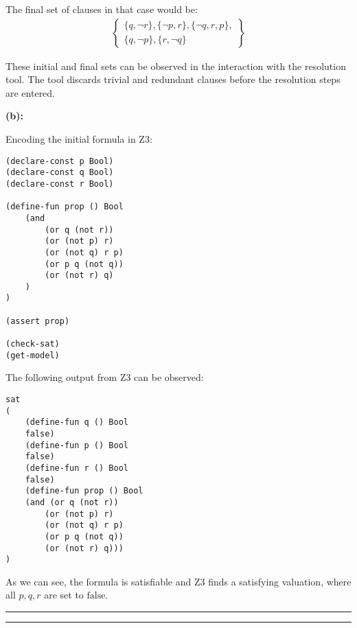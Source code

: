 \documentclass[12pt,letterpaper, onecolumn]{exam}
\begin{document}
\begin{questions}
	The final set of clauses in that case would be:
	\begin{align*}
		\left .
			\begin{cases}
				\{q, \neg r\}, \{\neg p, r\}, \{\neg q, r, p\}, \\
				\{ q, \neg p \}, \{ r, \neg q \}
			\end{cases}
		\right\}
	\end{align*}

	These initial and final sets can be observed in the interaction with the resolution tool. The tool discards trivial and redundant clauses before the resolution steps are entered.
	

	\textbf{(b):}

	Encoding the initial formula in Z3:

	\begin{lstlisting}
(declare-const p Bool)
(declare-const q Bool)
(declare-const r Bool)

(define-fun prop () Bool
	(and 
		(or q (not r)) 
		(or (not p) r) 
		(or (not q) r p) 
		(or p q (not q)) 
		(or (not r) q)
	)
)

(assert prop)

(check-sat)
(get-model)
	\end{lstlisting}

	The following output from Z3 can be observed:
\begin{lstlisting}
sat
(
	(define-fun q () Bool
	false)
	(define-fun p () Bool
	false)
	(define-fun r () Bool
	false)
	(define-fun prop () Bool
	(and (or q (not r))
		(or (not p) r)
		(or (not q) r p)
		(or p q (not q))
		(or (not r) q)))
)
\end{lstlisting}
As we can see, the formula is satisfiable and Z3 finds a satisfying valuation, where all $p, q, r$ are set to $\text{false}$.


    {\rule{17cm}{0.4pt}}
	\question[]
	\solutiontitle

    {\rule{17cm}{0.4pt}}

\end{questions}
\end{document}
